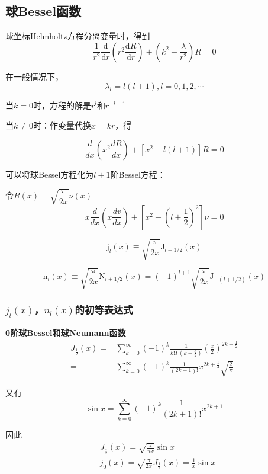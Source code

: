 \subsection{球Bessel函数}
球坐标Helmholtz方程分离变量时，得到
$$\frac1{r^2}\frac{\mathrm{d}}{\mathrm{d}r}{\left(r^2\frac{\mathrm{d}R}{\mathrm{d}r}\right)}+\left(k^2-\frac\lambda{r^2}\right)R=0$$

在一般情况下，$$\lambda_l=l(l+1),l=0,1,2,\cdots $$

当$k=0$时，方程的解是$r^l$和$r^{-l-1}$

当$k\ne0$时：作变量代换$x=kr$，得
\begin{dfn}[球Bessel方程]
$$\frac{d}{dx}(x^{2}\frac{dR}{dx})+[x^{2}-l(l+1)]R=0$$
\end{dfn}

\noindent 可以将球Bessel方程化为$l+1$阶Bessel方程：

令$R(x)=\sqrt{\dfrac{\pi}{2x}}\nu(x)$
$$x\frac{d}{dx}(x\frac{dv}{dx})+[x^{2}-(l+\frac{1}{2})^{2}]\nu=0$$

\begin{dfn}[$l$阶球Bessel函数]
    $$\mathrm{j}_l(x)\equiv\sqrt{\frac\pi{2x}}\mathrm{J}_{l+1/2}(x)$$
\end{dfn}

\begin{dfn}[$l$阶球Neumann函数]
    $$\mathrm{n}_l(x)\equiv\sqrt{\frac{\pi}{2x}}\mathrm{N}_{l+1/2}(x)=(-1)^{l+1}\sqrt{\frac\pi{2x}}\mathrm{J}_{-(l+1/2)}(x)$$
\end{dfn}

\subsubsection{$j_l(x)$，$n_l(x)$的初等表达式} 
\noindent \textbf{0阶球Bessel和球Neumann函数}
$$\begin{aligned}
    J_{\frac{1}{2}}(x)=&\sum_{k=0}^{\infty}(-1)^{k}\frac{1}{k!\Gamma(k+\frac{3}{2})}\left(\frac{x}{2}\right)^{2k+\frac{1}{2}}\\
    =&\sum_{k=0}^{\infty}(-1)^{k}\frac{1}{(2k+1)!}x^{2k+\frac{1}{2}}\sqrt{\frac{2}{\pi}}
\end{aligned}$$

又有
$$\sin x=\sum_{k=0}^{\infty}\left(-1\right)^{k}\frac{1}{\left(2k+1\right)!}x^{2k+1}$$

因此
$$\begin{aligned}
    &J_{\frac{1}{2}}(x)=\sqrt{\frac{z}{\pi x}}\sin x\\
    &j_{0}(x)=\sqrt{\frac{\pi}{2x}}J_{\frac{1}{2}}(x)=\frac{1}{x}\sin x
\end{aligned}$$

